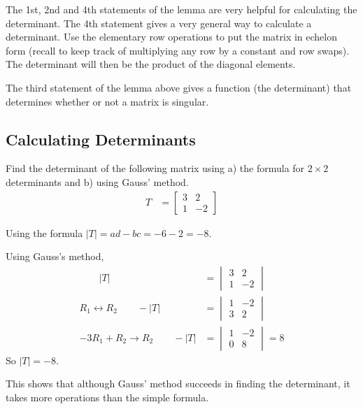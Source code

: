 The 1st, 2nd and 4th statements of the lemma are very helpful for calculating the determinant.  The 4th statement gives a very general way to calculate a determinant.  Use the elementary row operations to put the matrix in echelon form (recall to keep track of multiplying any row by a constant and row swaps).  The determinant will then be the product of the diagonal elements.  

The third statement of the lemma above gives a function (the determinant) that determines whether or not a matrix is singular.  

\subsection{Calculating Determinants}

\begin{example}
Find the determinant of the following matrix using a) the formula for $2 \times 2$ determinants and b) using Gauss' method.
%
\begin{align*}
T & = \begin{bmatrix}
3 & 2 \\
1 & -2 
\end{bmatrix}
\end{align*}

\solution

Using the formula $|T| = ad-bc=-6-2=-8$. 

Using Gauss's method, 
%
\begin{align*}
 \qquad |T|  &= \begin{vmatrix}
3 & 2 \\
1 & -2 
\end{vmatrix} \\
R_1 \leftrightarrow R_2 \qquad
-|T|&=  \begin{vmatrix}
1 & -2 \\
3 & 2 
\end{vmatrix} \\
-3R_1 + R_2 \rightarrow R_2 \qquad
-|T|&=  \begin{vmatrix}
1 & -2 \\
0 & 8 
\end{vmatrix} = 8
\end{align*}
So $|T|=-8$.  

This shows that although Gauss' method succeeds in finding the determinant, it takes more operations than the simple formula.  
\end{example}


